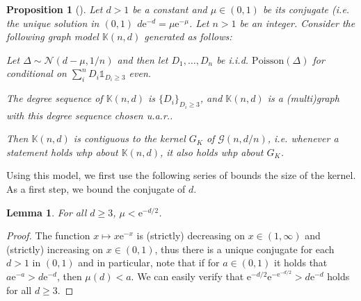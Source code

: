 \documentclass[11pt]{article}
\theoremstyle{plain}
\newtheorem{lemma}[theorem]{Lemma}
\newtheorem{proposition}[theorem]{Proposition}
\newcommand{\G}{\mathcal{G}}
\newcommand{\emm}{\mathrm{e}}
\newcommand{\Nc}{\mathcal{N}}
\newcommand{\1}{\mathbb{1}}
\newcommand{\Kb}{\mathbb{K}}
\newcommand{\Poisson}{\text{Poisson}}
\begin{document}
\begin{proposition}[{\cite[Theorem 1]{anatomy-of-giant}}]\label{prop:giant-model}
    Let \(d > 1\) be a constant and \(\mu\in(0,1)\) be its \emph{conjugate} (i.e. the unique solution in \((0,1)\) \(d\emm^{-d}=\mu\emm^{-\mu}\). Let \(n > 1\) be an integer. Consider the following graph model \(\Kb(n,d)\) generated as follows:

    Let \(\Delta\sim\Nc(d-\mu,1/n)\) and then let \(D_1,\dots,D_n\) be i.i.d. \(\Poisson(\Delta)\) for conditional on \(\sum_i^n D_i \1_{D_i \geq 3}\) even. 

    The degree sequence of \(\Kb(n,d)\) is \(\{D_i\}_{D_i\geq 3}\), and \(\Kb(n,d)\) is a (multi)graph with this degree sequence chosen u.a.r..
    





    Then \(\Kb(n,d)\) is \emph{contiguous} to the kernel \(G_K\) of \(\G(n,d/n)\), i.e. whenever a statement holds whp about \(\Kb(n,d)\), it also holds whp about \(G_K\).
\end{proposition}

Using this model, we first use the following series of bounds the size of the kernel. As a first step, we bound the conjugate of \(d\).

\begin{lemma}\label{lem:mu-bound}
    For all \(d\geq 3\), \(\mu < \emm^{-d/2}\).
\end{lemma}
\begin{proof}
    The function \(x\mapsto x\emm^{-x}\) is (strictly) decreasing on \(x\in(1,\infty)\) and (strictly) increasing on \(x\in(0,1)\), thus there is a unique conjugate for each \(d > 1\) in \((0,1)\) and in particular, note that if for \(a \in (0,1)\) it holds that \(a\emm^{-a} > d\emm^{-d}\), then \(\mu(d) < a\). We can easily verify that \( \emm^{-d/2} \emm^{-\emm^{-d/2}} > d\emm^{-d}\) holds for all \(d\geq 3\).
\end{proof}
\end{document}
